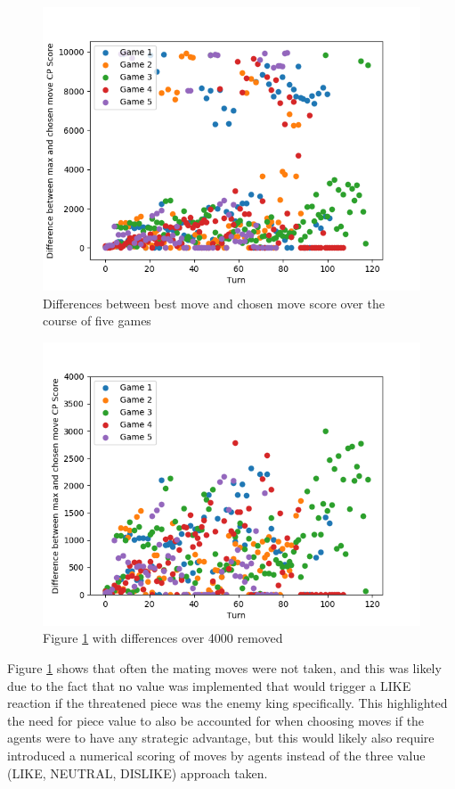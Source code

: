 \documentclass{article}
\begin{document}
\begin{figure}[]
	\centering
	\includegraphics[width=0.8\linewidth]{images/score_over_game}
	\caption{Differences between best move and chosen move score over the course of five games}
	\label{fig:scoreovergame}
\end{figure}

\begin{figure}[]
	\centering
	\includegraphics[width=0.8\linewidth]{images/score_over_game_filtered}
	\caption{Figure \ref{fig:scoreovergame} with differences over 4000 removed}
	\label{fig:scoreovergamefiltered}
\end{figure}

Figure \ref{fig:scoreovergame} shows that often the mating moves were not taken, and this was likely due to the fact that no value was implemented that would trigger a LIKE reaction if the threatened piece was the enemy king specifically. This highlighted the need for piece value to also be accounted for when choosing moves if the agents were to have any strategic advantage, but this would likely also require introduced a numerical scoring of moves by agents instead of the three value (LIKE, NEUTRAL, DISLIKE) approach taken.
\end{document}
